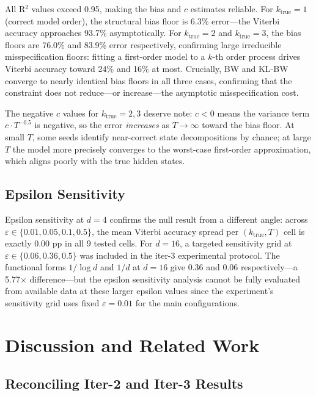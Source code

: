 \documentclass[11pt,letterpaper]{article}
\begin{document}
All R$^2$ values exceed 0.95, making the bias and $c$ estimates reliable. For $k_\text{true}=1$ (correct model order), the
structural bias floor is 6.3\% error---the Viterbi accuracy approaches 93.7\% asymptotically. For $k_\text{true}=2$ and
$k_\text{true}=3$, the bias floors are 76.0\% and 83.9\% error respectively, confirming large irreducible misspecification
floors: fitting a first-order model to a $k$-th order process drives Viterbi accuracy toward 24\% and 16\% at most.
Crucially, BW and KL-BW converge to nearly identical bias floors in all three cases, confirming that the constraint does
not reduce---or increase---the asymptotic misspecification cost.

The negative $c$ values for $k_\text{true}=2,3$ deserve note: $c < 0$ means the variance term $c \cdot T^{-0.5}$ is
negative, so the error \emph{increases} as $T \to \infty$ toward the bias floor. At small $T$, some seeds identify
near-correct state decompositions by chance; at large $T$ the model more precisely converges to the worst-case first-order
approximation, which aligns poorly with the true hidden states.

\subsection{Epsilon Sensitivity}

Epsilon sensitivity at $d=4$ confirms the null result from a different angle: across
$\varepsilon \in \{0.01, 0.05, 0.1, 0.5\}$, the mean Viterbi accuracy spread per $(k_\text{true}, T)$ cell is exactly
0.00 pp in all 9 tested cells. For $d=16$, a targeted sensitivity grid at $\varepsilon \in \{0.06, 0.36, 0.5\}$ was
included in the iter-3 experimental protocol. The functional forms $1/\log d$ and $1/d$ at $d=16$ give 0.36 and 0.06
respectively---a 5.77$\times$ difference---but the epsilon sensitivity analysis cannot be fully evaluated from available
data at these larger epsilon values since the experiment's sensitivity grid uses fixed $\varepsilon=0.01$ for the main
configurations.

\section{Discussion and Related Work}

\subsection{Reconciling Iter-2 and Iter-3 Results}
\end{document}
